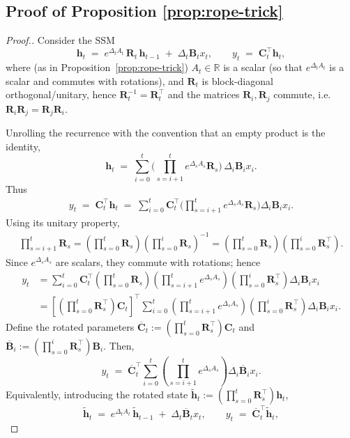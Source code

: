 \documentclass{article}
\def\vh{{\bm{h}}}
\def\bB{{\bm{B}}}
\def\bC{{\bm{C}}}
\def\bR{{\bm{R}}}
\theoremstyle{plain}
\theoremstyle{definition}
\theoremstyle{remark}
\begin{document}
\subsection{Proof of Proposition \ref{prop:rope-trick}}
\label{app:proof-rope-trick}
\PropRoPETrick*
\begin{proof}[Proof.]
Consider the SSM
\begin{equation}
    \vh_t \;=\; e^{\Delta_t A_t}\,\bR_t\,\vh_{t-1} \;+\; \Delta_t\bB_t x_t, 
    \qquad 
    y_t \;=\; \bC_t^\top \vh_t,
\end{equation}
where (as in Proposition~\ref{prop:rope-trick}) \(A_t\in\mathbb{R}\) is a scalar (so that \(e^{\Delta_t A_t}\) is a scalar and commutes with rotations), and \(\bR_t\) is block-diagonal orthogonal/unitary, hence \(\bR_t^{-1}=\bR_t^\top\) and the matrices $\bR_i, \bR_j$ commute, i.e. $\bR_i\bR_j=\bR_j\bR_i$.

Unrolling the recurrence with the convention that an empty product is the identity,
\begin{equation}
    \vh_t \;=\; \sum_{i=0}^{t} 
    \bigg(\prod_{s=i+1}^{t} e^{\Delta_s A_s}\bR_s\bigg)\,\Delta_i\bB_i x_i.
\end{equation}
Thus
\begin{align}
    y_t 
    \;=\; \bC_t^\top \vh_t
    \;=\; \sum_{i=0}^{t} \bC_t^\top 
    \bigg(\prod_{s=i+1}^{t} e^{\Delta_s A_s}\bR_s\bigg)\Delta_i\bB_i x_i.
\end{align}
Using its unitary property,
\begin{align*}
    \prod_{s=i+1}^{t}\bR_s 
    = \left(\prod_{s=0}^{t}\bR_s\right)\left(\prod_{s=0}^{i}\bR_s\right)^{-1}
    = \left(\prod_{s=0}^{t}\bR_s\right)\left(\prod_{s=0}^{i}\bR_s^\top\right).
\end{align*}
Since \(e^{\Delta_s A_s}\) are scalars, they commute with rotations; hence
\begin{align}
    y_t 
    &= \sum_{i=0}^{t} 
       \bC_t^\top \left(\prod_{s=0}^{t}\bR_s\right)
       \left(\prod_{s=i+1}^{t} e^{\Delta_s A_s}\right)
       \left(\prod_{s=0}^{i}\bR_s^\top\right) \Delta_i \bB_i x_i \\
    &= \left[\left(\prod_{s=0}^{t}\bR_s^\top\right)\bC_t\right]^\top 
       \sum_{i=0}^{t} 
       \left(\prod_{s=i+1}^{t} e^{\Delta_s A_s}\right)
       \left(\prod_{s=0}^{i}\bR_s^\top\right)\Delta_i \bB_i x_i.
\end{align}
Define the rotated parameters
\(
\overline{\bC}_t := \left(\prod_{s=0}^{t}\bR_s^\top\right)\bC_t
\)
and
\(
\overline{\bB}_i := \left(\prod_{s=0}^{i}\bR_s^\top\right)\bB_i.
\)
Then,
\begin{equation}
    y_t \;=\; \overline{\bC}_t^\top 
    \sum_{i=0}^{t} \left(\prod_{s=i+1}^{t} e^{\Delta_s A_s}\right)\Delta_i \overline{\bB}_i x_i.
\end{equation}
Equivalently, introducing the rotated state \(\tilde{\vh}_t := \left(\prod_{s=0}^{t}\bR_s^\top\right)\vh_t\),
\begin{equation}
    \tilde{\vh}_t \;=\; e^{\Delta_t A_t}\,\tilde{\vh}_{t-1} \;+\; \Delta_t \overline{\bB}_t x_t,
    \qquad
    y_t \;=\; \overline{\bC}_t^\top \tilde{\vh}_t,
\end{equation}
\end{proof}
\end{document}

